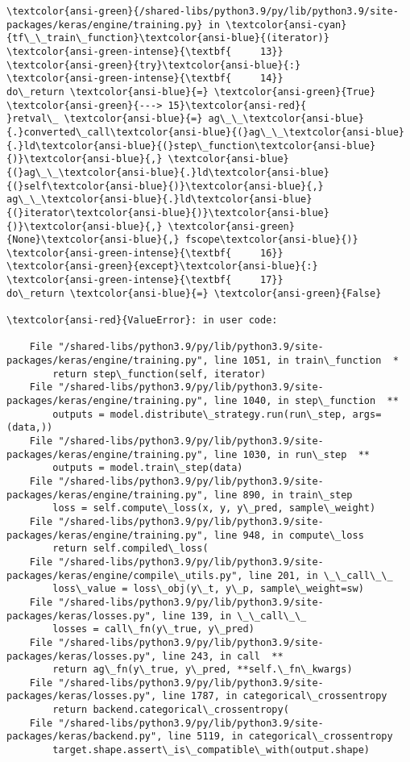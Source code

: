\documentclass[12pt,a4paper,table]{article}
\begin{document}
\begin{Verbatim}[commandchars=\\\{\}, frame=single, framerule=2mm, rulecolor=\color{outerrorbackground}]
\textcolor{ansi-green}{/shared-libs/python3.9/py/lib/python3.9/site-packages/keras/engine/training.py} in \textcolor{ansi-cyan}{tf\_\_train\_function}\textcolor{ansi-blue}{(iterator)}
\textcolor{ansi-green-intense}{\textbf{     13}}                 \textcolor{ansi-green}{try}\textcolor{ansi-blue}{:}
\textcolor{ansi-green-intense}{\textbf{     14}}                     do\_return \textcolor{ansi-blue}{=} \textcolor{ansi-green}{True}
\textcolor{ansi-green}{---> 15}\textcolor{ansi-red}{                     }retval\_ \textcolor{ansi-blue}{=} ag\_\_\textcolor{ansi-blue}{.}converted\_call\textcolor{ansi-blue}{(}ag\_\_\textcolor{ansi-blue}{.}ld\textcolor{ansi-blue}{(}step\_function\textcolor{ansi-blue}{)}\textcolor{ansi-blue}{,} \textcolor{ansi-blue}{(}ag\_\_\textcolor{ansi-blue}{.}ld\textcolor{ansi-blue}{(}self\textcolor{ansi-blue}{)}\textcolor{ansi-blue}{,} ag\_\_\textcolor{ansi-blue}{.}ld\textcolor{ansi-blue}{(}iterator\textcolor{ansi-blue}{)}\textcolor{ansi-blue}{)}\textcolor{ansi-blue}{,} \textcolor{ansi-green}{None}\textcolor{ansi-blue}{,} fscope\textcolor{ansi-blue}{)}
\textcolor{ansi-green-intense}{\textbf{     16}}                 \textcolor{ansi-green}{except}\textcolor{ansi-blue}{:}
\textcolor{ansi-green-intense}{\textbf{     17}}                     do\_return \textcolor{ansi-blue}{=} \textcolor{ansi-green}{False}

\textcolor{ansi-red}{ValueError}: in user code:

    File "/shared-libs/python3.9/py/lib/python3.9/site-packages/keras/engine/training.py", line 1051, in train\_function  *
        return step\_function(self, iterator)
    File "/shared-libs/python3.9/py/lib/python3.9/site-packages/keras/engine/training.py", line 1040, in step\_function  **
        outputs = model.distribute\_strategy.run(run\_step, args=(data,))
    File "/shared-libs/python3.9/py/lib/python3.9/site-packages/keras/engine/training.py", line 1030, in run\_step  **
        outputs = model.train\_step(data)
    File "/shared-libs/python3.9/py/lib/python3.9/site-packages/keras/engine/training.py", line 890, in train\_step
        loss = self.compute\_loss(x, y, y\_pred, sample\_weight)
    File "/shared-libs/python3.9/py/lib/python3.9/site-packages/keras/engine/training.py", line 948, in compute\_loss
        return self.compiled\_loss(
    File "/shared-libs/python3.9/py/lib/python3.9/site-packages/keras/engine/compile\_utils.py", line 201, in \_\_call\_\_
        loss\_value = loss\_obj(y\_t, y\_p, sample\_weight=sw)
    File "/shared-libs/python3.9/py/lib/python3.9/site-packages/keras/losses.py", line 139, in \_\_call\_\_
        losses = call\_fn(y\_true, y\_pred)
    File "/shared-libs/python3.9/py/lib/python3.9/site-packages/keras/losses.py", line 243, in call  **
        return ag\_fn(y\_true, y\_pred, **self.\_fn\_kwargs)
    File "/shared-libs/python3.9/py/lib/python3.9/site-packages/keras/losses.py", line 1787, in categorical\_crossentropy
        return backend.categorical\_crossentropy(
    File "/shared-libs/python3.9/py/lib/python3.9/site-packages/keras/backend.py", line 5119, in categorical\_crossentropy
        target.shape.assert\_is\_compatible\_with(output.shape)


\end{Verbatim}
\end{document}
